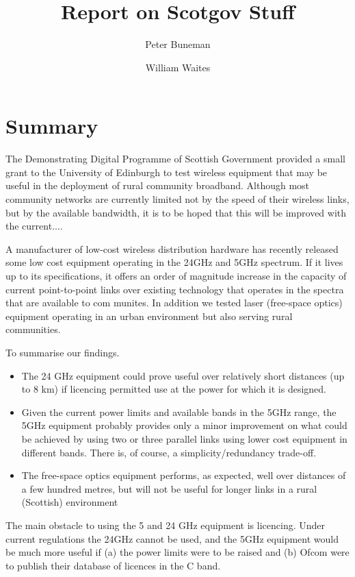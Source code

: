 \documentclass{amsart}
\title{Report on Scotgov Stuff}
\author{Peter Buneman \and William Waites}
\begin{document}
\maketitle
\tableofcontents
\section{Summary}
The Demonstrating Digital Programme of Scottish Government provided a small grant to the
University of Edinburgh to test wireless equipment that may be useful in the
deployment of rural community broadband.  Although most community
networks are currently limited not by the speed of their wireless
links, but by the available bandwidth, it is to be hoped that this
will be improved with the current....

A manufacturer of low-cost wireless distribution hardware has recently
released some low cost equipment operating in the 24GHz and 5GHz
spectrum.  If it lives up to its specifications, it offers an order of
magnitude increase in the capacity of current point-to-point links
over existing technology that operates in the spectra that are
available to com
munites.  In addition we tested laser (free-space
optics) equipment operating in an urban environment but also serving
rural communities.

To summarise our findings.
\begin{itemize}
\item The 24 GHz equipment could prove useful over relatively short
distances (up to 8 km) if licencing permitted use at the power for
which it is designed.

\item Given the current power limits and available bands in the 
5GHz range, the 5GHz equipment probably provides only a minor
improvement on what could be achieved by using two or three parallel
links using lower cost equipment in different bands.  There is, of
course, a simplicity/redundancy trade-off.

\item The free-space optics equipment performs, as expected, well over
  distances of a few hundred metres, but will not be useful for longer
  links in a rural (Scottish) environment
\end{itemize}

The main obstacle to using the 5 and 24 GHz equipment is licencing.
Under current regulations the 24GHz cannot be used, and the 5GHz
equipment would be much more useful if (a)  the power limits were to
be raised and (b) Ofcom were to publish their database of licences in
the C band.
\end{document}
